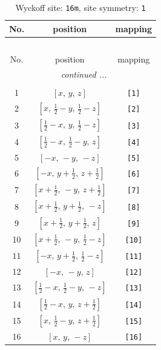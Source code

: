 \documentclass[fleqn,8pt]{jsarticle}
\begin{document}
\begin{longtable}{ccc}
\caption{Wyckoff site: {\tt 16m}, site symmetry: {\tt 1}}
 \\
 \hline \hline
No. & position & mapping \\ \hline \endfirsthead

\multicolumn{2}{l}{\tablename\ \thetable{}} \\
 \hline \hline
No. & position & mapping \\ \hline \endhead

 \hline \hline
\multicolumn{2}{r}{\footnotesize\it continued ...} \\ \endfoot

 \hline \hline
\multicolumn{2}{r}{} \\ \endlastfoot

1 & $\left[ x,\, y,\, z \right]$ & {\tt [1]} \\ \hline
2 & $\left[ x,\, \frac{1}{2} - y,\, \frac{1}{2} - z \right]$ & {\tt [2]} \\ \hline
3 & $\left[ \frac{1}{2} - x,\, y,\, \frac{1}{2} - z \right]$ & {\tt [3]} \\ \hline
4 & $\left[ \frac{1}{2} - x,\, \frac{1}{2} - y,\, z \right]$ & {\tt [4]} \\ \hline
5 & $\left[ - x,\, - y,\, - z \right]$ & {\tt [5]} \\ \hline
6 & $\left[ - x,\, y + \frac{1}{2},\, z + \frac{1}{2} \right]$ & {\tt [6]} \\ \hline
7 & $\left[ x + \frac{1}{2},\, - y,\, z + \frac{1}{2} \right]$ & {\tt [7]} \\ \hline
8 & $\left[ x + \frac{1}{2},\, y + \frac{1}{2},\, - z \right]$ & {\tt [8]} \\ \hline
9 & $\left[ x + \frac{1}{2},\, y + \frac{1}{2},\, z \right]$ & {\tt [9]} \\ \hline
10 & $\left[ x + \frac{1}{2},\, - y,\, \frac{1}{2} - z \right]$ & {\tt [10]} \\ \hline
11 & $\left[ - x,\, y + \frac{1}{2},\, \frac{1}{2} - z \right]$ & {\tt [11]} \\ \hline
12 & $\left[ - x,\, - y,\, z \right]$ & {\tt [12]} \\ \hline
13 & $\left[ \frac{1}{2} - x,\, \frac{1}{2} - y,\, - z \right]$ & {\tt [13]} \\ \hline
14 & $\left[ \frac{1}{2} - x,\, y,\, z + \frac{1}{2} \right]$ & {\tt [14]} \\ \hline
15 & $\left[ x,\, \frac{1}{2} - y,\, z + \frac{1}{2} \right]$ & {\tt [15]} \\ \hline
16 & $\left[ x,\, y,\, - z \right]$ & {\tt [16]} \\
\end{longtable}
\end{document}
